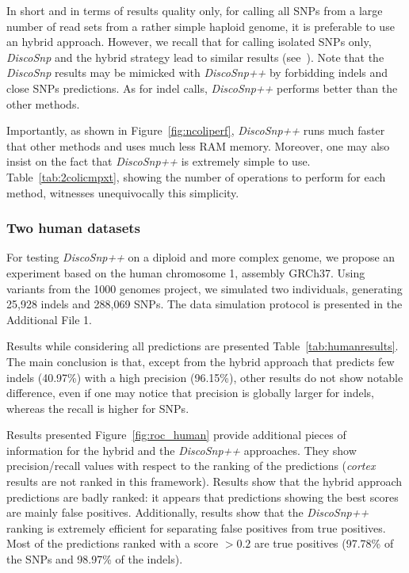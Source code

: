 \documentclass{bmcart}
\newcommand{\disco}{{\it DiscoSnp}\xspace}
\newcommand{\discopp}{{\it DiscoSnp++}\xspace}
\newcommand{\co}{{\it cortex}\xspace}
\begin{document}
In short and in terms of results quality only, for calling all SNPs from a large number of read sets from a rather simple haploid genome, it is preferable to use an hybrid approach. However, we recall that for calling isolated SNPs only, \disco and the hybrid strategy lead to similar results (see~\cite{Uricaru2014a}). Note that the \disco results may be mimicked with \discopp by forbidding indels and close SNPs predictions. As for indel calls, \discopp performs better than the other methods.

Importantly, as shown in Figure~\ref{fig:ncoliperf}, \discopp runs much faster that other methods and uses much less RAM memory. Moreover, one may also insist on the fact that \discopp is extremely simple to use. Table~\ref{tab:2colicmpxt}, showing the number of operations to perform for each method, witnesses unequivocally
this simplicity.

\subsubsection*{Two human datasets}
\label{ssec:twohumans}
For testing \discopp on a diploid and more complex genome, we propose an experiment based on the human chromosome 1, assembly GRCh37. Using variants from the 1000 genomes project, we simulated two individuals, generating 25,928 indels and 288,069 SNPs. 
The data simulation protocol is presented in the Additional File 1. 

Results while 
considering all predictions are presented Table~\ref{tab:humanresults}. 
The main conclusion is that, except from the hybrid approach that predicts few indels (40.97\%) with a high precision (96.15\%), other results do not show  notable difference, even if one may notice that precision is globally larger for indels, whereas the recall is higher for SNPs. 

Results presented Figure~\ref{fig:roc_human} provide additional pieces of information for the hybrid and the \discopp approaches. They show precision/recall values with respect to the ranking of the predictions (\co results are not ranked in this framework). Results show that the hybrid approach predictions are badly ranked: it appears that predictions showing the best scores are mainly false positives. Additionally, results show that the \discopp ranking is extremely efficient for separating false positives from true positives. Most of the predictions ranked with a score $>0.2$ are true positives (97.78\%  of the SNPs and 98.97\% of the indels). 
\end{document}

